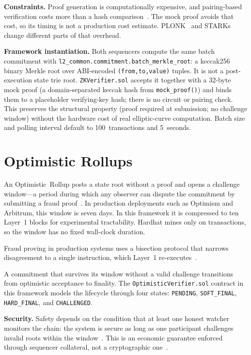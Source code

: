 \textbf{Constraints.}
Proof generation is computationally expensive, and pairing-based verification costs more than a hash comparison~\cite{groth2016size}. The mock proof avoids that cost, so its timing is not a production cost estimate. PLONK~\cite{gabizon2019plonk} and STARKs~\cite{bensasson2018stark} change different parts of that overhead.

\textbf{Framework instantiation.}
Both sequencers compute the same batch commitment with \texttt{l2\_common.commitment.batch\_merkle\_root}: a keccak256 binary Merkle root over ABI-encoded \texttt{(from,to,value)} tuples. It is not a post-execution state trie root. \texttt{ZKVerifier.sol} accepts it together with a 32-byte mock proof (a domain-separated keccak hash from \texttt{mock\_proof()}) and binds them to a placeholder verifying-key hash; there is no circuit or pairing check. This preserves the structural property (proof required at submission; no challenge window) without the hardware cost of real elliptic-curve computation. Batch size and polling interval default to 100~transactions and 5~seconds.

\section{Optimistic Rollups}
\label{sec:optimistic}

An Optimistic~Rollup posts a state root without a proof and opens a challenge window---a period during which any observer can dispute the commitment by submitting a fraud proof~\cite{arbitrum-original}. In production deployments such as Optimism and Arbitrum, this window is seven days. In this framework it is compressed to ten Layer~1 blocks for experimental tractability. Hardhat mines only on transactions, so the window has no fixed wall-clock duration.

Fraud proving in production systems uses a bisection protocol that narrows disagreement to a single instruction, which Layer~1 re-executes~\cite{arbitrum-original}.

A commitment that survives its window without a valid challenge transitions from optimistic acceptance to finality. The \texttt{OptimisticVerifier.sol} contract in this framework models the lifecycle through four states: \texttt{PENDING}, \texttt{SOFT\_FINAL}, \texttt{HARD\_FINAL}, and \texttt{CHALLENGED}.

\textbf{Security.}
Safety depends on the condition that at least one honest watcher monitors the chain: the system is secure as long as one participant challenges invalid roots within the window~\cite{arbitrum-original}. This is an economic guarantee enforced through sequencer collateral, not a cryptographic one~\cite{sok-layer2}.

